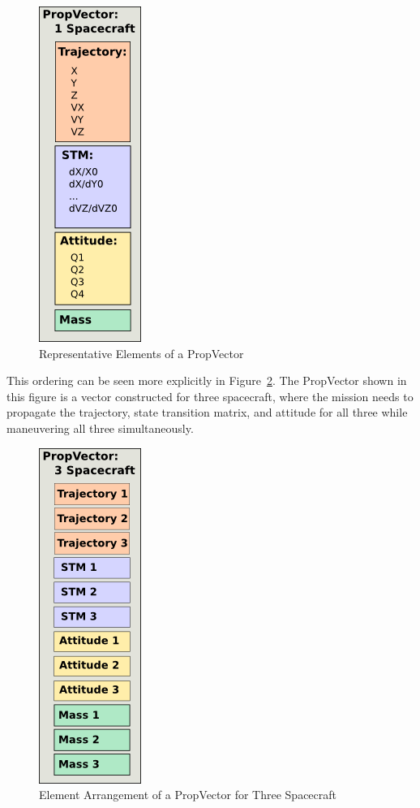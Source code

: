 \begin{figure}[htb]
\begin{center}
\includegraphics[63,207]{Images/PropVectorComponents.png}
\caption{\label{figure:PropVectorComponents}Representative Elements of a PropVector}
\end{center}
\end{figure}

This ordering can be seen more explicitly in Figure~\ref{figure:ThreeSatPropVector}.  The
PropVector shown in this figure is a vector constructed for three spacecraft, where the mission
needs to propagate the trajectory, state transition matrix, and attitude for all three while
maneuvering all three simultaneously.

\begin{figure}[htb]
\begin{center}
\includegraphics[63,207]{Images/ThreeSatPropVector.png}
\caption{\label{figure:ThreeSatPropVector}Element Arrangement of a PropVector for Three
Spacecraft}
\end{center}
\end{figure}


